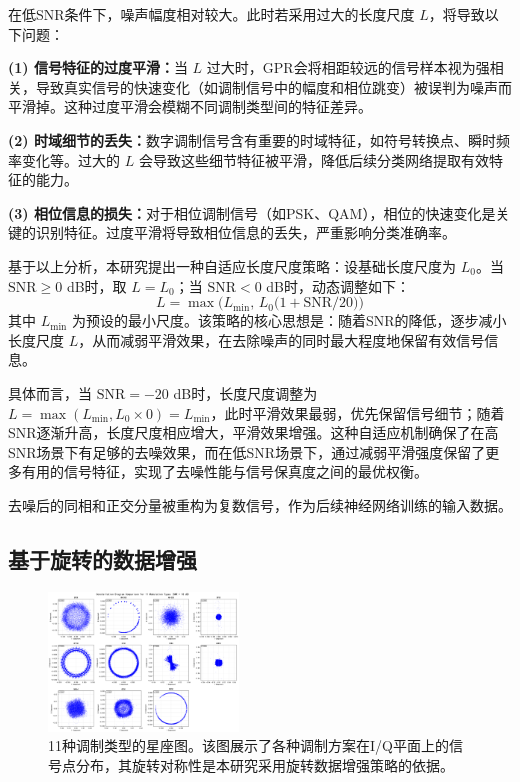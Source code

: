 \documentclass{article}
\begin{document}
在低SNR条件下，噪声幅度相对较大。此时若采用过大的长度尺度 $L$，将导致以下问题：

\textbf{(1) 信号特征的过度平滑：}当 $L$ 过大时，GPR会将相距较远的信号样本视为强相关，导致真实信号的快速变化（如调制信号中的幅度和相位跳变）被误判为噪声而平滑掉。这种过度平滑会模糊不同调制类型间的特征差异。

\textbf{(2) 时域细节的丢失：}数字调制信号含有重要的时域特征，如符号转换点、瞬时频率变化等。过大的 $L$ 会导致这些细节特征被平滑，降低后续分类网络提取有效特征的能力。

\textbf{(3) 相位信息的损失：}对于相位调制信号（如PSK、QAM），相位的快速变化是关键的识别特征。过度平滑将导致相位信息的丢失，严重影响分类准确率。

基于以上分析，本研究提出一种自适应长度尺度策略：设基础长度尺度为 $L_0$。当 $\mathrm{SNR}\ge0$ dB时，取 $L=L_0$；当 $\mathrm{SNR}<0$ dB时，动态调整如下：
\begin{equation}
L = \max\bigl(L_{\min},\,L_0\bigl(1+\mathrm{SNR}/20\bigr)\bigr)
\end{equation}
其中 $L_{\min}$ 为预设的最小尺度。该策略的核心思想是：随着SNR的降低，逐步减小长度尺度 $L$，从而减弱平滑效果，在去除噪声的同时最大程度地保留有效信号信息。

具体而言，当 $\mathrm{SNR}=-20$ dB时，长度尺度调整为 $L=\max(L_{\min}, L_0 \times 0)=L_{\min}$，此时平滑效果最弱，优先保留信号细节；随着SNR逐渐升高，长度尺度相应增大，平滑效果增强。这种自适应机制确保了在高SNR场景下有足够的去噪效果，而在低SNR场景下，通过减弱平滑强度保留了更多有用的信号特征，实现了去噪性能与信号保真度之间的最优权衡。

去噪后的同相和正交分量被重构为复数信号，作为后续神经网络训练的输入数据。

\subsection{基于旋转的数据增强}

\begin{figure}[htbp]
\centering
\includegraphics[width=0.45\textwidth]{figure/constellation.png}
\caption{11种调制类型的星座图。该图展示了各种调制方案在I/Q平面上的信号点分布，其旋转对称性是本研究采用旋转数据增强策略的依据。}
\label{fig:constellation}
\end{figure}
\end{document}
